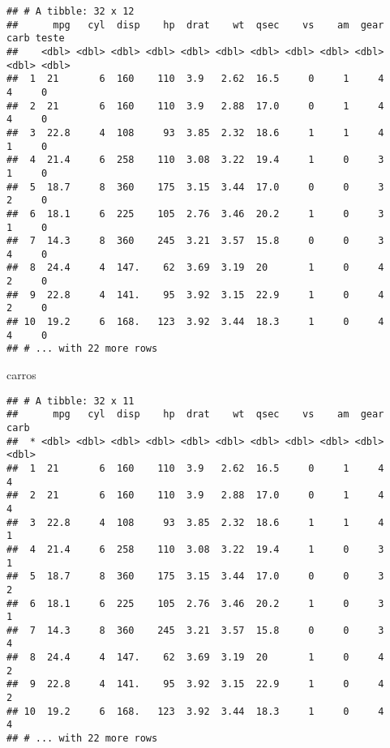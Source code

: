 \documentclass[]{book}
\newenvironment{Shaded}{\begin{snugshade}}{\end{snugshade}}
\newcommand{\DataTypeTok}[1]{\textcolor[rgb]{0.13,0.29,0.53}{#1}}
\newcommand{\DecValTok}[1]{\textcolor[rgb]{0.00,0.00,0.81}{#1}}
\newcommand{\KeywordTok}[1]{\textcolor[rgb]{0.13,0.29,0.53}{\textbf{#1}}}
\newcommand{\NormalTok}[1]{#1}
\newcommand{\OperatorTok}[1]{\textcolor[rgb]{0.81,0.36,0.00}{\textbf{#1}}}
\newcommand{\StringTok}[1]{\textcolor[rgb]{0.31,0.60,0.02}{#1}}
\begin{document}
\begin{Shaded}
\end{Shaded}

\begin{verbatim}
## # A tibble: 32 x 12
##      mpg   cyl  disp    hp  drat    wt  qsec    vs    am  gear  carb teste
##    <dbl> <dbl> <dbl> <dbl> <dbl> <dbl> <dbl> <dbl> <dbl> <dbl> <dbl> <dbl>
##  1  21       6  160    110  3.9   2.62  16.5     0     1     4     4     0
##  2  21       6  160    110  3.9   2.88  17.0     0     1     4     4     0
##  3  22.8     4  108     93  3.85  2.32  18.6     1     1     4     1     0
##  4  21.4     6  258    110  3.08  3.22  19.4     1     0     3     1     0
##  5  18.7     8  360    175  3.15  3.44  17.0     0     0     3     2     0
##  6  18.1     6  225    105  2.76  3.46  20.2     1     0     3     1     0
##  7  14.3     8  360    245  3.21  3.57  15.8     0     0     3     4     0
##  8  24.4     4  147.    62  3.69  3.19  20       1     0     4     2     0
##  9  22.8     4  141.    95  3.92  3.15  22.9     1     0     4     2     0
## 10  19.2     6  168.   123  3.92  3.44  18.3     1     0     4     4     0
## # ... with 22 more rows
\end{verbatim}

\begin{Shaded}
\begin{Highlighting}[]
\NormalTok{carros}
\end{Highlighting}
\end{Shaded}

\begin{verbatim}
## # A tibble: 32 x 11
##      mpg   cyl  disp    hp  drat    wt  qsec    vs    am  gear  carb
##  * <dbl> <dbl> <dbl> <dbl> <dbl> <dbl> <dbl> <dbl> <dbl> <dbl> <dbl>
##  1  21       6  160    110  3.9   2.62  16.5     0     1     4     4
##  2  21       6  160    110  3.9   2.88  17.0     0     1     4     4
##  3  22.8     4  108     93  3.85  2.32  18.6     1     1     4     1
##  4  21.4     6  258    110  3.08  3.22  19.4     1     0     3     1
##  5  18.7     8  360    175  3.15  3.44  17.0     0     0     3     2
##  6  18.1     6  225    105  2.76  3.46  20.2     1     0     3     1
##  7  14.3     8  360    245  3.21  3.57  15.8     0     0     3     4
##  8  24.4     4  147.    62  3.69  3.19  20       1     0     4     2
##  9  22.8     4  141.    95  3.92  3.15  22.9     1     0     4     2
## 10  19.2     6  168.   123  3.92  3.44  18.3     1     0     4     4
## # ... with 22 more rows
\end{verbatim}
\end{document}
